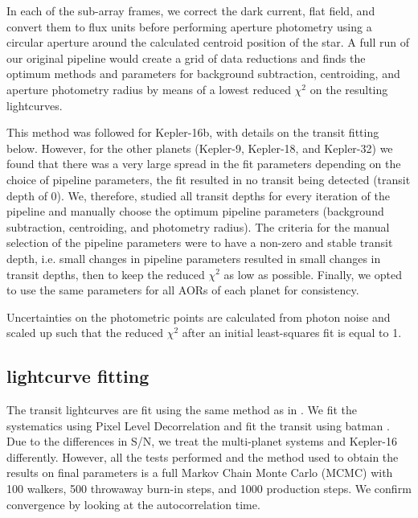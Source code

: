 In each of the \spitzer sub-array frames, we correct the dark current, flat field, and convert them to flux units before performing aperture photometry using a circular aperture around the calculated centroid position of the star. A full run of our original pipeline would create a grid of data reductions and finds the optimum methods and parameters for background subtraction, centroiding, and aperture photometry radius by means of a lowest reduced $\chi^2$ on the resulting lightcurves.

This method was followed for Kepler-16b, with details on the transit fitting below. However, for the other planets (Kepler-9, Kepler-18, and Kepler-32) we found that there was a very large spread in the fit parameters depending on the choice of pipeline parameters, the fit resulted in no transit being detected (transit depth of 0). We, therefore, studied all transit depths for every iteration of the pipeline and manually choose the optimum pipeline parameters (background subtraction, centroiding, and photometry radius). The criteria for the manual selection of the pipeline parameters were to have a non-zero and stable transit depth, i.e. small changes in pipeline parameters resulted in small changes in transit depths, then to keep the reduced $\chi^2$ as low as possible. Finally, we opted to use the same parameters for all AORs of each planet for consistency.


Uncertainties on the photometric points are calculated from photon noise and scaled up such that the reduced $\chi^2$ after an initial least-squares fit is equal to 1.

\subsection{\spitzerIRAC lightcurve fitting}

The \spitzerIRAC transit lightcurves are fit using the same method as in \citet{Baxter2021}. We fit the \spitzer systematics using Pixel Level Decorrelation \citep{Deming2015} and fit the transit using batman \citep{Kreidberg2015}. Due to the differences in S/N, we treat the multi-planet systems and Kepler-16 differently. However, all the tests performed and the method used to obtain the results on final parameters is a full Markov Chain Monte Carlo (MCMC) with 100 walkers, 500 throwaway burn-in steps, and 1000 production steps. We confirm convergence by looking at the autocorrelation time.


